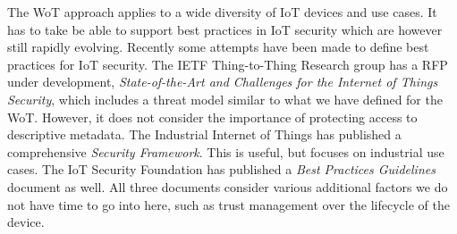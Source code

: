The WoT approach applies to a wide diversity of IoT devices and use cases.
It has to take be able to support best practices in IoT security which
are however still rapidly evolving.
Recently some attempts have been made to define
best practices for IoT security.
The IETF Thing-to-Thing Research group has a RFP under development,
\emph{State-of-the-Art and Challenges for the Internet of Things 
Security}\cite{Garcia2017a}, which includes a threat model similar to 
what we have defined for the WoT.  However, it does not consider the 
importance of protecting access to descriptive metadata.
The Industrial Internet of Things has published a comprehensive
\emph{Security Framework}\cite{Iic2016sf}.
This is useful, but focuses on industrial use cases.
The IoT Security Foundation has published
a \textit{Best Practices Guidelines}\cite{Iotsf2017a}
document as well.
All three documents consider various additional factors we do
not have time to go into here, such as trust management over the 
lifecycle of the device.
